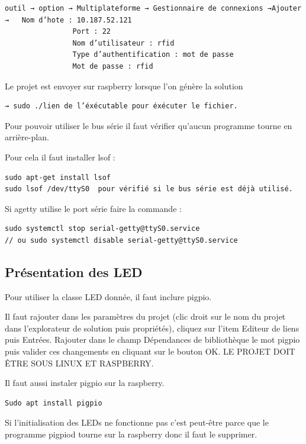 \documentclass[main.tex]{subfiles}
\begin{document}
\begin{lstlisting}
outil → option → Multiplateforme → Gestionnaire de connexions →Ajouter →   Nom d’hote : 10.187.52.121
            	Port : 22
            	Nom d’utilisateur : rfid
            	Type d’authentification : mot de passe
            	Mot de passe : rfid
\end{lstlisting}

Le projet est envoyer sur raspberry lorsque l’on génère la solution

\begin{lstlisting}
→ sudo ./lien de l’éxécutable pour éxécuter le fichier.
\end{lstlisting}

Pour pouvoir utiliser le bus série il faut vérifier qu’aucun programme tourne en arrière-plan.

Pour cela il faut installer lsof :

\begin{lstlisting}
sudo apt-get install lsof
sudo lsof /dev/ttyS0  pour vérifié si le bus série est déjà utilisé.
\end{lstlisting}
Si agetty utilise le port série faire la commande :

\begin{lstlisting}
sudo systemctl stop serial-getty@ttyS0.service
// ou sudo systemctl disable serial-getty@ttyS0.service
\end{lstlisting}

\subsection{Présentation des LED}

Pour utiliser la classe LED donnée, il faut inclure pigpio. 

Il faut rajouter dans les paramètres du projet (clic droit sur le nom du projet dans l’explorateur de solution puis propriétés), cliquez sur l’item Editeur de liens puis Entrées. Rajouter dans le champ Dépendances de bibliothèque le mot pigpio puis valider ces changements en cliquant sur le bouton OK. LE PROJET DOIT ÊTRE SOUS LINUX ET RASPBERRY.

Il faut aussi instaler pigpio sur la raspberry.

\begin{lstlisting}
Sudo apt install pigpio
\end{lstlisting}

Si l’initialisation des LEDs ne fonctionne pas c’est peut-être parce que le
programme pigpiod tourne sur la raspberry donc il faut le supprimer.
\end{document}
